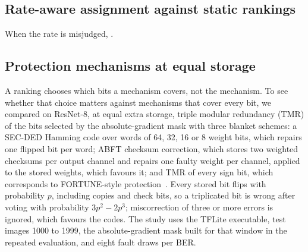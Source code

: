 \subsection{Rate-aware assignment against static rankings}\label{sec:rateaware}
\begin{figure}[t]
\centering{}
\caption{}\label{fig:rateaware}
\end{figure}
  When the rate is misjudged, .

\subsection{Protection mechanisms at equal storage}\label{sec:mechanisms}\label{sec:correction}
A ranking chooses which bits a mechanism covers, not the mechanism. To see whether that choice matters against mechanisms that cover every bit, we compared on ResNet-8, at equal extra storage, triple modular redundancy (TMR) of the bits selected by the absolute-gradient mask with three blanket schemes: a SEC-DED Hamming code over words of 64, 32, 16 or 8 weight bits, which repairs one flipped bit per word; ABFT checksum correction, which stores two weighted checksums per output channel and repairs one faulty weight per channel, applied to the stored weights, which favours it; and TMR of every sign bit, which corresponds to FORTUNE-style protection~\cite{nazari2024fortune}. Every stored bit flips with probability $p$, including copies and check bits, so a triplicated bit is wrong after voting with probability $3p^2-2p^3$; miscorrection of three or more errors is ignored, which favours the codes. The study uses the TFLite executable, test images 1000 to 1999, the absolute-gradient mask built for that window in the repeated evaluation, and eight fault draws per BER.

